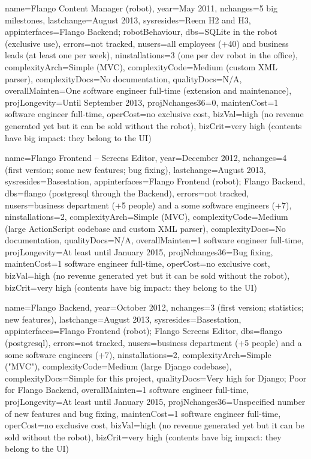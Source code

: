 \begin{inventory}
{name=Flango Content Manager (robot), 
year=May 2011,
nchanges=5 big milestones,
lastchange=August 2013,
sysresides=Reem H2 and H3,
appinterfaces=Flango Backend; robotBehaviour,
dbs=SQLite in the robot (exclusive use),
errors=not tracked,
nusers=all employees (+40) and business leads (at least one per week),
ninstallations=3 (one per dev robot in the office),
complexityArch=Simple (MVC),
complexityCode=Medium (custom \ac{XML} parser),
complexityDocs=No documentation,
qualityDocs=N/A,
overallMainten=One software engineer full-time (extension and maintenance),
projLongevity=Until September 2013,
projNchanges36=0,
maintenCost=1 software engineer full-time,
operCost=no exclusive cost,
bizVal=high (no revenue generated yet but it can be sold without the robot),
bizCrit=very high (contents have big impact: they belong to the \ac{UI})
}
\end{inventory}

\begin{inventory}
{
name=Flango Frontend -- Screens Editor, 
year=December 2012,
nchanges=4 (first version; some new features; bug fixing),
lastchange=August 2013,
sysresides=Basestation,
appinterfaces=Flango Frontend (robot); Flango Backend,
dbs=flango (postgresql through the Backend),
errors=not tracked,
nusers=business department (+5 people) and a some software engineers (+7),
ninstallations=2,
complexityArch=Simple (MVC),
complexityCode=Medium (large ActionScript codebase and custom \ac{XML} parser),
complexityDocs=No documentation,
qualityDocs=N/A,
overallMainten=1 software engineer full-time,
projLongevity=At least until January 2015,
projNchanges36=Bug fixing,
maintenCost=1 software engineer full-time,
operCost=no exclusive cost,
bizVal=high (no revenue generated yet but it can be sold without the robot),
bizCrit=very high (contents have big impact: they belong to the \ac{UI})
}
\end{inventory}

\begin{inventory}
{
name=Flango Backend, 
year=October 2012,
nchanges=3 (first version; statistics; new features),
lastchange=August 2013,
sysresides=Basestation,
appinterfaces=Flango Frontend (robot); Flango Screens Editor,
dbs=flango (postgresql),
errors=not tracked,
nusers=business department (+5 people) and a some software engineers (+7),
ninstallations=2,
complexityArch=Simple ("MVC"),
complexityCode=Medium (large Django codebase),
complexityDocs=Simple for this project,
qualityDocs=Very high for Django; Poor for Flango Backend,
overallMainten=1 software engineer full-time,
projLongevity=At least until January 2015,
projNchanges36=Unspecified number of new features and bug fixing,
maintenCost=1 software engineer full-time,
operCost=no exclusive cost,
bizVal=high (no revenue generated yet but it can be sold without the robot),
bizCrit=very high (contents have big impact: they belong to the \ac{UI})
}
\end{inventory}    

